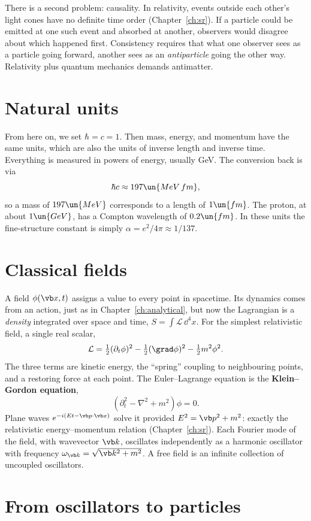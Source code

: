 There is a second problem: causality. In relativity, events outside each other's light cones have no definite time order (Chapter~\ref{ch:sr}). If a particle could be emitted at one such event and absorbed at another, observers would disagree about which happened first. Consistency requires that what one observer sees as a particle going forward, another sees as an \emph{antiparticle} going the other way. Relativity plus quantum mechanics demands antimatter.

\section{Natural units}

From here on, we set $\hbar = c = 1$. Then mass, energy, and momentum have the same units, which are also the units of inverse length and inverse time. Everything is measured in powers of energy, usually GeV. The conversion back is via
\[
  \hbar c\approx197\un{MeV\,fm},
\]
so a mass of $197\un{MeV}$ corresponds to a length of $1\un{fm}$. The proton, at about $1\un{GeV}$, has a Compton wavelength of $0.2\un{fm}$. In these units the fine-structure constant is simply $\alpha = e^2/4\pi\approx1/137$.

\section{Classical fields}

A field $\phi(\vb x,t)$ assigns a value to every point in spacetime. Its dynamics comes from an action, just as in Chapter~\ref{ch:analytical}, but now the Lagrangian is a \emph{density} integrated over space and time, $S = \int\mathcal{L}\,\dd^4x$. For the simplest relativistic field, a single real scalar,
\[
  \mathcal{L} = \tfrac12(\partial_t\phi)^2 - \tfrac12(\grad\phi)^2 - \tfrac12m^2\phi^2 .
\]
The three terms are kinetic energy, the ``spring'' coupling to neighbouring points, and a restoring force at each point. The Euler--Lagrange equation is the \textbf{Klein--Gordon equation},
\[
  \left(\partial_t^2 - \nabla^2 + m^2\right)\phi = 0 .
\]
Plane waves $e^{-i(Et-\vb p\cdot\vb x)}$ solve it provided $E^2 = \vb p^2 + m^2$: exactly the relativistic energy--momentum relation (Chapter~\ref{ch:sr}). Each Fourier mode of the field, with wavevector $\vb k$, oscillates independently as a harmonic oscillator with frequency $\omega_{\vb k} = \sqrt{\vb k^2 + m^2}$. A free field is an infinite collection of uncoupled oscillators.

\section{From oscillators to particles}

